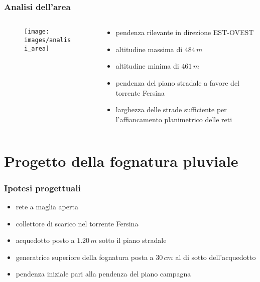 \documentclass{beamer}
\begin{document}
\begin{frame}
 \frametitle{Analisi dell'area}
 
 \begin{columns}
  \begin{column}{.5\textwidth}
   \begin{figure}
    \centering
    \texttt{[image: images/analisi\_area]}
   \end{figure}
  \end{column}
  
  \begin{column}{.5\textwidth}
   \begin{itemize}[<+->]
    \item pendenza rilevante in direzione EST-OVEST
    \item altitudine massima di $484\,m$
    \item altitudine minima di $461\,m$
    \item pendenza del piano stradale a favore del torrente Fersina
    \item larghezza delle strade sufficiente per l'affiancamento planimetrico delle reti
   \end{itemize}
  \end{column}
 \end{columns} 
\end{frame}

\section{Progetto della fognatura pluviale}
\begin{frame}
 \frametitle{Ipotesi progettuali}
 \begin{itemize}[<+->]
  \item rete a maglia aperta
  \item collettore di scarico nel torrente Fersina
  \item acquedotto posto a $1.20\,m$ sotto il piano stradale
  \item generatrice superiore della fognatura posta a $30\,cm$ al di sotto dell'acquedotto
  \item pendenza iniziale pari alla pendenza del piano campagna
 \end{itemize}
\end{frame}
\end{document}
